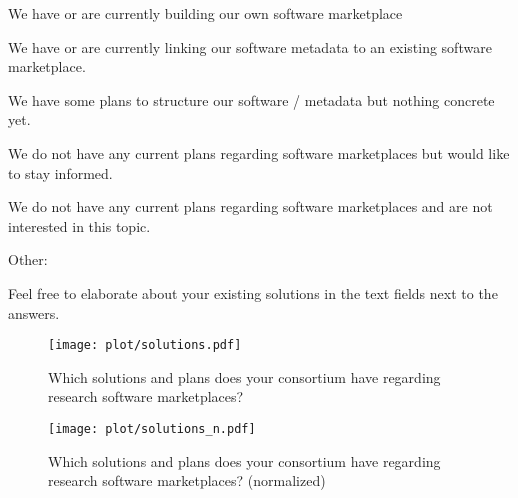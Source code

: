 \documentclass[headsepline,titlepage,twoside,12pt,toc=flat,headings=normal]{scrreprt}
\newcommand{\otherbox}{\fbox{\phantom{This is how big an answer would be.}}}
\begin{document}
\begin{answers}
\item We have or are currently building our own software marketplace
\item We have or are currently linking our software metadata to an existing software marketplace.
\item We have some plans to structure our software / metadata but nothing concrete yet.
\item We do not have any current plans regarding software marketplaces but would like to stay informed.
\item We do not have any current plans regarding software marketplaces and are not interested in this topic.
\item Other: \otherbox
\end{answers}

Feel free to elaborate about your existing solutions in the text fields
next to the answers.

\begin{figure}[h!]
\caption{Which solutions and plans does your consortium have regarding research software marketplaces?}
\label{fig:solutions}
\texttt{[image: plot/solutions.pdf]}
\end{figure}

\begin{figure}[h!]
\caption{Which solutions and plans does your consortium have regarding research software marketplaces? (normalized)}
\label{fig:solutions_n}
\texttt{[image: plot/solutions\_n.pdf]}
\end{figure}
\end{document}

